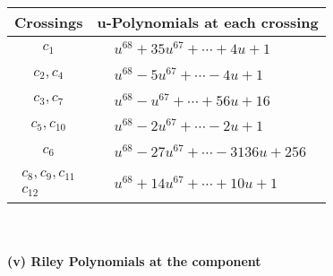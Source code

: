 \documentclass[1p]{elsarticle_modified}
\theoremstyle{definition}
\begin{document}
\begin{tabular}{m{50pt}|m{274pt}}
Crossings & \hspace{64pt}u-Polynomials at each crossing \\
\hline $$\begin{aligned}c_{1}\end{aligned}$$&$\begin{aligned}
&u^{68}+35 u^{67}+\cdots+4 u+1
\end{aligned}$\\
\hline $$\begin{aligned}c_{2},c_{4}\end{aligned}$$&$\begin{aligned}
&u^{68}-5 u^{67}+\cdots-4 u+1
\end{aligned}$\\
\hline $$\begin{aligned}c_{3},c_{7}\end{aligned}$$&$\begin{aligned}
&u^{68}- u^{67}+\cdots+56 u+16
\end{aligned}$\\
\hline $$\begin{aligned}c_{5},c_{10}\end{aligned}$$&$\begin{aligned}
&u^{68}-2 u^{67}+\cdots-2 u+1
\end{aligned}$\\
\hline $$\begin{aligned}c_{6}\end{aligned}$$&$\begin{aligned}
&u^{68}-27 u^{67}+\cdots-3136 u+256
\end{aligned}$\\
\hline $$\begin{aligned}c_{8},c_{9},c_{11}\\c_{12}\end{aligned}$$&$\begin{aligned}
&u^{68}+14 u^{67}+\cdots+10 u+1
\end{aligned}$\\
\hline
\end{tabular}\\~\\
\newpage\renewcommand{\arraystretch}{1}
\flushleft \textbf{(v) Riley Polynomials at the component}\newline \\
\end{document}
